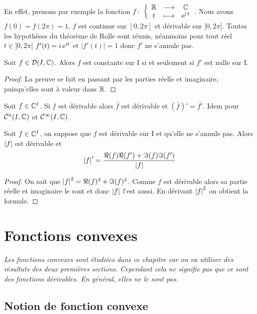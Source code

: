 En effet, prenons par exemple la fonction \(f\colon \left\{\begin{array}{ccc} \mathbb{R} & \longrightarrow &\mathbb{C}\\ t & \longmapsto & \operatorname{e}^{\operatorname{i} t} \end{array} \right.\). Nous avons \(f(0)=f(2\pi)=1\), \(f\) est continue sur \([0,2\pi]\) et dérivable sur \(]0,2\pi[\). Toutes les hypothèses du théorème de Rolle sont réunis, néanmoins pour tout réel \(t \in ]0,2\pi[\) \(f'(t)=i \operatorname{e}^{it}\) et \(|f'(t)|=1\) donc \(f'\) ne s'annule pas.

\begin{theo}
  Soit \(f \in \mathcal{D}(I,\mathbb{C})\). Alors \(f\) est constante sur I si et seulement si \(f'\) est nulle sur I.
\end{theo}
\begin{proof}
  La preuve se fait en passant par les parties réelle et imaginaire, puisqu'elles sont à valeur dans \(\mathbb{R}\).
\end{proof}
\begin{prop}
  Soit \(f \in \mathbb{C}^I\). Si \(f\) est dérivable alors \(\bar{f}\) est dérivable et \(\left(\bar{f}\right)'=\bar{f'}\). Idem pour \(\mathcal{C}^{n}(I,\mathbb{C})\) et \(\mathcal{C}^{\infty}(I,\mathbb{C})\)
\end{prop}
\begin{prop}
  Soit \(f \in \mathbb{C}^I\), on suppose que \(f\) est dérivable sur I et qu'elle ne s'annule pas. Alors \(\left\lvert f\right\rvert\) est dérivable et
  \begin{equation}
    \left\lvert f\right\rvert'=\frac{\Re(f)\Re(f') + \Im(f)\Im(f')}{\left\lvert f\right\rvert}
  \end{equation}
\end{prop}
\begin{proof}
  On sait que \(\left\lvert f\right\rvert^2=\Re(f)^2+\Im(f)^2\). Comme \(f\) est dérivable alors sa partie réelle et imaginaire le sont et donc \(\left\lvert f\right\rvert\) l'est aussi. En dérivant \(\left\lvert f\right\rvert^2\) on obtient la formule.
\end{proof}

\section{Fonctions convexes}

\emph{Les fonctions convexes sont étudiées dans ce chapitre car on va utiliser des résultats des deux premières sections. Cependant cela ne signifie pas que ce sont des fonctions dérivables. En général, elles ne le sont pas.}

\subsection{Notion de fonction convexe}

